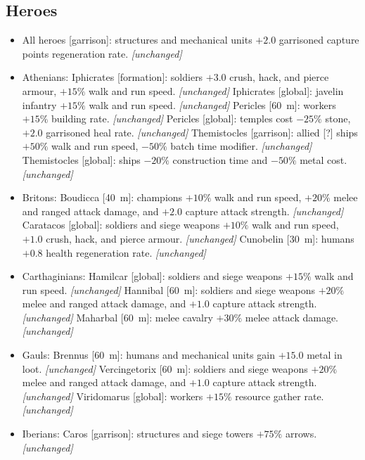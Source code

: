 \documentclass{article}
\begin{document}
\clearpage
\subsection{Heroes}
\begin{itemize}
  \item All heroes [garrison]: structures and mechanical units $+2.0$ garrisoned capture points regeneration rate. \emph{[unchanged]}
  \item Athenians:
  \subitem Iphicrates [formation]: soldiers $+3.0$ crush, hack, and pierce armour, $+15\%$ walk and run speed. \emph{[unchanged]}
  \subitem Iphicrates [global]: javelin infantry $+15\%$ walk and run speed. \emph{[unchanged]}
  \subitem Pericles [60~m]: workers $+15\%$ building rate. \emph{[unchanged]}
  \subitem Pericles [global]: temples cost $-25\%$ stone, $+2.0$ garrisoned heal rate. \emph{[unchanged]}
  \subitem Themistocles [garrison]: allied [?] ships $+50\%$ walk and run speed, $-50\%$ batch time modifier. \emph{[unchanged]}
  \subitem Themistocles [global]: ships $-20\%$ construction time and $-50\%$ metal cost. \emph{[unchanged]}
  \item Britons:
  \subitem Boudicca [40~m]: champions $+10\%$ walk and run speed, $+20\%$ melee and ranged attack damage, and $+2.0$ capture attack strength. \emph{[unchanged]}
  \subitem Caratacos [global]: soldiers and siege weapons $+10\%$ walk and run speed, $+1.0$ crush, hack, and pierce armour. \emph{[unchanged]}
  \subitem Cunobelin [30~m]: humans $+0.8$ health regeneration rate. \emph{[unchanged]}
  \item Carthaginians:
  \subitem Hamilcar [global]: soldiers and siege weapons $+15\%$ walk and run speed. \emph{[unchanged]}
  \subitem Hannibal [60~m]: soldiers and siege weapons $+20\%$ melee and ranged attack damage, and $+1.0$ capture attack strength. \emph{[unchanged]}
  \subitem Maharbal [60~m]: melee cavalry $+30\%$ melee attack damage. \emph{[unchanged]}
  \item Gauls:
  \subitem Brennus [60~m]: humans and mechanical units gain $+15.0$ metal in loot. \emph{[unchanged]}
  \subitem Vercingetorix [60~m]: soldiers and siege weapons $+20\%$ melee and ranged attack damage, and $+1.0$ capture attack strength. \emph{[unchanged]}
  \subitem Viridomarus [global]: workers $+15\%$ resource gather rate. \emph{[unchanged]}
  \item Iberians:
  \subitem Caros [garrison]: structures and siege towers $+75\%$ arrows. \emph{[unchanged]}

\end{itemize}
\end{document}
